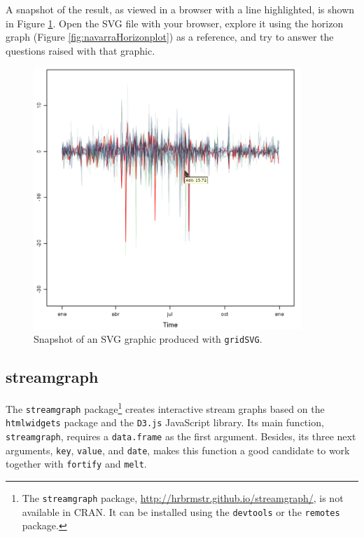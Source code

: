\documentclass[smallroyalvopaper]{memoir}
\begin{document}
A snapshot of the result, as viewed in a browser with a line
highlighted, is shown in Figure \ref{fig:navarraSVG}. Open the SVG
file with your browser, explore it using the horizon graph (Figure
\ref{fig:navarraHorizonplot}) as a reference, and try to answer the
questions raised with that graphic.

\begin{figure}
  \centering
  \includegraphics[width=0.9\textwidth]{figs/navarraSVG_captura.png}
  \caption{\label{fig:navarraSVG}Snapshot of an SVG graphic produced with \texttt{gridSVG}.}
\end{figure}

\subsection{streamgraph \label{sec:interactive_streamgraph}}
\label{sec:org9d562b4}

The \texttt{streamgraph} package\footnote{The \texttt{streamgraph} package, \url{http://hrbrmstr.github.io/streamgraph/}, is not available in CRAN. It can be installed using the \texttt{devtools} or the \texttt{remotes} package.} creates interactive stream graphs based on
the \texttt{htmlwidgets} package and the \texttt{D3.js} JavaScript library. Its main
function, \texttt{streamgraph}, requires a \texttt{data.frame} as the first
argument. Besides, its three next arguments, \texttt{key}, \texttt{value}, and
\texttt{date}, makes this function a good candidate to work together with
\texttt{fortify} and \texttt{melt}.
\end{document}
